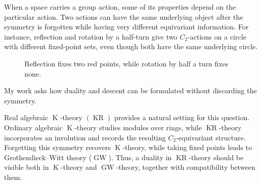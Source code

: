 \documentclass[11pt]{article}
\newcommand{\KR}{\operatorname{KR}}
\newcommand{\K}{\operatorname{K}}
\newcommand{\GW}{\operatorname{GW}}
\begin{document}
When a space carries a group action, some of its properties depend on the particular action. 
Two actions can have the same underlying object after the symmetry is forgotten while having very different equivariant information.
For instance, reflection and rotation by a half-turn give two $C_2$-actions on a circle with different fixed-point sets, even though both have the same underlying circle.

\begin{figure}[h]
\centering
{}

\captionsetup{font=footnotesize,skip=0.3em}
\caption{Reflection fixes two red points, while rotation by half a turn fixes none.}
\label{fig:circle-actions}
\end{figure}
\noindent My work asks how duality and descent can be formulated without discarding the symmetry.

Real algebraic $\K$-theory $(\KR)$ provides a natural setting for this question.
Ordinary algebraic $\K$-theory studies modules over rings, while $\KR$-theory incorporates an involution and records the resulting $C_2$-equivariant structure.
Forgetting this symmetry recovers $\K$-theory, while taking fixed points leads to Grothendieck--Witt theory ($\GW$).
Thus, a duality in $\KR$-theory should be visible both in $\K$-theory and $\GW$-theory, together with compatibility between them.
\end{document}
